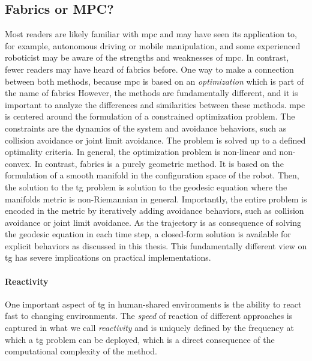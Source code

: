 \subsection{Fabrics or MPC?}
\label{sec:discussion_fabrics_or_mpc}

Most readers are likely familiar with \acl{mpc} and may have seen its application
to, for example, autonomous driving or mobile manipulation, and some 
experienced roboticist may be aware of the strengths and weaknesses of
\ac{mpc}. In contrast, fewer readers may have heard of \ac{fabrics} before.
One way to make a connection between both methods, because
\ac{mpc} is based on an \textit{optimization} which is part
of the name of \acf{fabrics}
However, the methods are
fundamentally different,
and it is important to analyze the differences and similarities between
these methods.
\ac{mpc} is centered around the
formulation of a constrained optimization problem. The constraints are
the dynamics of the system and avoidance behaviors, such as collision avoidance
or joint limit avoidance. The problem is solved up to a defined optimality 
criteria. In general, the optimization problem is non-linear and non-convex.
In contrast, \ac{fabrics} is a purely geometric method. It is based on the
formulation of a smooth manifold in the configuration space of the robot.
Then, the solution to the \ac{tg} problem is solution to the geodesic equation
where the manifolds metric is non-Riemannian in general. Importantly, the entire
problem is encoded in the metric by iteratively adding avoidance
behaviors, such as collision avoidance or joint limit avoidance. As the
trajectory is as consequence of solving the geodesic equation in each time step, a
closed-form solution is available for explicit behaviors as discussed in this
thesis.
This fundamentally different view on \ac{tg} has severe implications on
practical implementations.

\paragraph{Reactivity}
\label{par:discussion_reactivity}

One important aspect of \ac{tg} in human-shared environments is the ability to
react fast to changing environments. The \textit{speed} of reaction
of different approaches is captured in what we call
\textit{reactivity} and is uniquely defined by the frequency
at which a \ac{tg} problem can be deployed, which is a
direct consequence of the computational complexity of the
method.

